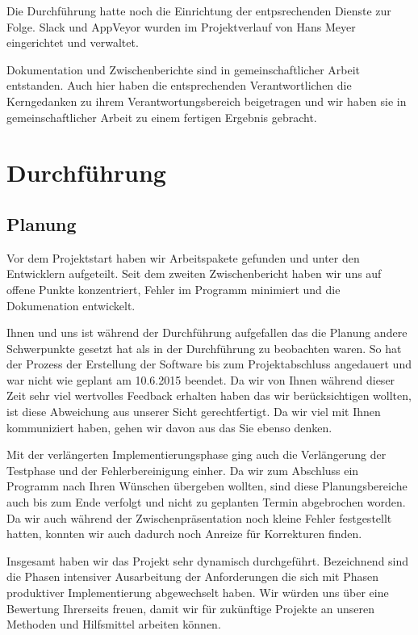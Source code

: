 \documentclass[12pt]{article}
\begin{document}
Die Durchführung hatte noch die Einrichtung der entpsrechenden Dienste zur Folge. Slack und AppVeyor wurden im Projektverlauf von Hans Meyer eingerichtet und verwaltet. 
\newline

Dokumentation und Zwischenberichte sind in gemeinschaftlicher Arbeit entstanden. Auch hier haben die entsprechenden Verantwortlichen die Kerngedanken zu ihrem Verantwortungsbereich beigetragen und wir haben sie in gemeinschaftlicher Arbeit zu einem fertigen Ergebnis gebracht.
\newline

\newpage
\section{Durchführung}
\subsection{Planung}

Vor dem Projektstart haben wir Arbeitspakete gefunden und unter den Entwicklern aufgeteilt. Seit dem zweiten Zwischenbericht haben wir uns auf offene Punkte konzentriert, Fehler im Programm minimiert und die Dokumenation entwickelt.
\newline 

Ihnen und uns ist während der Durchführung aufgefallen das die Planung andere Schwerpunkte gesetzt hat als in der Durchführung zu beobachten waren. So hat der Prozess der Erstellung der Software bis zum Projektabschluss angedauert und war nicht wie geplant am 10.6.2015 beendet. Da wir von Ihnen während dieser Zeit sehr viel wertvolles Feedback erhalten haben das wir berücksichtigen wollten, ist diese Abweichung aus unserer Sicht gerechtfertigt. Da wir viel mit Ihnen kommuniziert haben, gehen wir davon aus das Sie ebenso denken.
\newline

Mit der verlängerten Implementierungsphase ging auch die Verlängerung der Testphase und der Fehlerbereinigung einher. Da wir zum Abschluss ein Programm nach Ihren Wünschen übergeben wollten, sind diese Planungsbereiche auch bis zum Ende verfolgt und nicht zu geplanten Termin abgebrochen worden. Da wir auch während der Zwischenpräsentation noch kleine Fehler festgestellt hatten, konnten wir auch dadurch noch Anreize für Korrekturen finden.
\newline

Insgesamt haben wir das Projekt sehr dynamisch durchgeführt. Bezeichnend sind die Phasen intensiver Ausarbeitung der Anforderungen die sich mit Phasen produktiver Implementierung abgewechselt haben. Wir würden uns über eine Bewertung Ihrerseits freuen, damit wir für zukünftige Projekte an unseren Methoden und Hilfsmittel arbeiten können.
\end{document}

